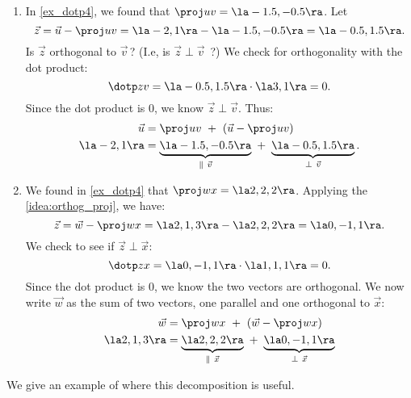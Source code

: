 {\begin{enumerate}
	\item In \autoref{ex_dotp4}, we found that $\proj uv = \la -1.5,-0.5\ra$. Let $$\vec z = \vec u - \proj uv = \la -2,1\ra - \la -1.5,-0.5\ra = \la-0.5, 1.5\ra.$$
	Is $\vec z$ orthogonal to $\vec v$\,? (I.e, is $\vec z \perp\vec v$\ ?) We check for orthogonality with the dot product:
	$$\dotp zv = \la -0.5,1.5\ra \cdot \la 3,1\ra =0.$$
	Since the dot product is 0, we know $\vec z \perp \vec v$. Thus:
	\begin{align*}
	\vec u &= \proj uv\ +\ (\vec u - \proj uv) \\
	\la -2,1\ra &= \underbrace{\la -1.5,-0.5\ra}_{\parallel\ \vec v}\ +\ \underbrace{\la -0.5,1.5\ra}_{\perp \ \vec v}.
	\end{align*}
	
	\item	We found in \autoref{ex_dotp4} that $\proj wx = \la 2,2,2\ra$. Applying the \autoref{idea:orthog_proj}, we have:
	$$\vec z = \vec w - \proj wx = \la 2,1,3\ra  - \la 2,2,2\ra = \la 0,-1,1\ra.$$ We check to see if $\vec z \perp \vec x$:
	$$\dotp zx = \la 0,-1,1\ra \cdot \la 1,1,1\ra = 0.$$
	Since the dot product is 0, we know the two vectors are orthogonal.
	We now write $\vec w$ as the sum of two vectors, one parallel and one orthogonal to $\vec x$:
	\begin{align*}
	\vec w &= \proj wx\ +\ (\vec w - \proj wx) \\
	\la 2,1,3\ra &= \underbrace{\la 2,2,2\ra}_{\parallel\ \vec x}\ +\ \underbrace{\la 0,-1,1\ra}_{\perp \ \vec x} 
	\end{align*}
\end{enumerate}}

We give an example of where this decomposition is useful.

